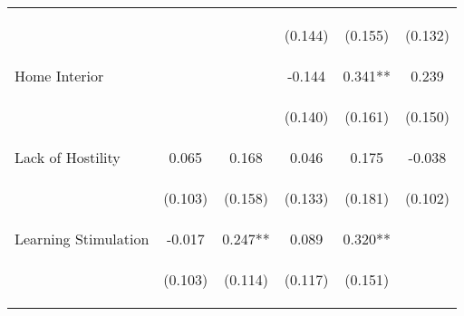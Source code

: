 \begin{tabular}{lccccc}
 & \begin{footnotesize}\end{footnotesize} & \begin{footnotesize}\end{footnotesize} & \begin{footnotesize}(0.144)\end{footnotesize} & \begin{footnotesize}(0.155)\end{footnotesize} & \begin{footnotesize}(0.132)\end{footnotesize}\\
\noalign{\smallskip}Home Interior &  &  & -0.144 & 0.341** & 0.239\\
 & \begin{footnotesize}\end{footnotesize} & \begin{footnotesize}\end{footnotesize} & \begin{footnotesize}(0.140)\end{footnotesize} & \begin{footnotesize}(0.161)\end{footnotesize} & \begin{footnotesize}(0.150)\end{footnotesize}\\
\noalign{\smallskip}Lack of Hostility & 0.065 & 0.168 & 0.046 & 0.175 & -0.038\\
 & \begin{footnotesize}(0.103)\end{footnotesize} & \begin{footnotesize}(0.158)\end{footnotesize} & \begin{footnotesize}(0.133)\end{footnotesize} & \begin{footnotesize}(0.181)\end{footnotesize} & \begin{footnotesize}(0.102)\end{footnotesize}\\
\noalign{\smallskip}Learning Stimulation & -0.017 & 0.247** & 0.089 & 0.320** & \\
 & \begin{footnotesize}(0.103)\end{footnotesize} & \begin{footnotesize}(0.114)\end{footnotesize} & \begin{footnotesize}(0.117)\end{footnotesize} & \begin{footnotesize}(0.151)\end{footnotesize} & \begin{footnotesize}\end{footnotesize}\\

\end{tabular}
